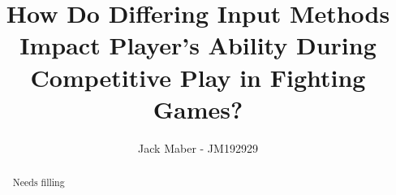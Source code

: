 \documentclass[journal]{IEEEtran}
\begin{document}
%
\title{How Do Differing Input Methods Impact Player's Ability During Competitive Play in Fighting Games?}
%
%
\author{Jack Maber - JM192929}


\maketitle

\begin{abstract}
Needs filling
\end{abstract}
\end{document}
